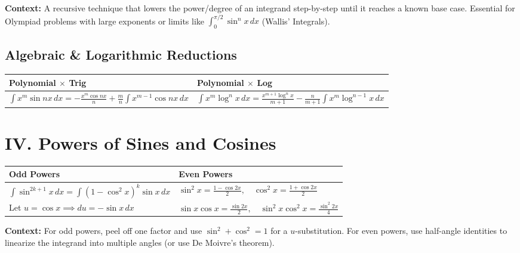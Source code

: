 \documentclass[11pt, a4paper]{article}
\begin{document}
\vspace{0.2cm}

\textbf{\color{accent}\small Context:} A recursive technique that lowers the power/degree of an integrand step-by-step until it reaches a known base case. Essential for Olympiad problems with large exponents or limits like $\int_0^{\pi/2} \sin^n x \, dx$ (Wallis' Integrals).

\subsection*{\color{secondary} Algebraic \& Logarithmic Reductions}
\begin{center}
\begin{tabular}{@{}p{} p{}@{}}
\toprule
\textbf{Polynomial $\times$ Trig} & \textbf{Polynomial $\times$ Log} \\
\midrule
$\int x^m \sin nx \, dx = -\frac{x^m \cos nx}{n} + \frac{m}{n} \int x^{m-1} \cos nx \, dx$ & $\int x^m \log^n x \, dx = \frac{x^{m+1} \log^n x}{m+1} - \frac{n}{m+1} \int x^m \log^{n-1} x \, dx$ \\
\bottomrule
\end{tabular}
\end{center}

\vspace{0.3cm}

\section*{\color{primary} IV. Powers of Sines and Cosines}

\begin{center}
\begin{tabular}{@{}p{} p{}@{}}
\toprule
\textbf{Odd Powers} & \textbf{Even Powers} \\
\midrule
$\int \sin^{2k+1} x \, dx = \int (1-\cos^2 x)^k \sin x \, dx$ & $\sin^2 x = \frac{1-\cos 2x}{2}, \quad \cos^2 x = \frac{1+\cos 2x}{2}$ \\
Let $u = \cos x \implies du = -\sin x \, dx$ & $\sin x \cos x = \frac{\sin 2x}{2}, \quad \sin^2 x \cos^2 x = \frac{\sin^2 2x}{4}$ \\
\bottomrule
\end{tabular}
\end{center}

\vspace{0.2cm}

\textbf{\color{accent}\small Context:} For odd powers, peel off one factor and use $\sin^2+\cos^2=1$ for a $u$-substitution. For even powers, use half-angle identities to linearize the integrand into multiple angles (or use De Moivre's theorem).
\end{document}
